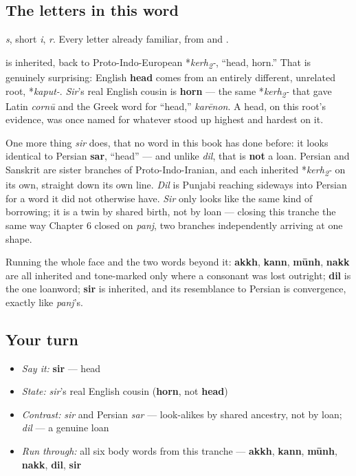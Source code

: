 \subsection*{The letters in this word}
\textbf{} \emph{s}, \textbf{} short \emph{i}, \textbf{} \emph{r}. Every letter already familiar, from \textbf{} and \textbf{}.

\begin{cousinweb}
\textbf{} is inherited, back to Proto-Indo-European *\emph{kerh\textsubscript{2}-}, \textquotedblleft{}head, horn.\textquotedblright{} That is genuinely surprising: English \textbf{head} comes from an entirely different, unrelated root, *\emph{kaput-}. \emph{Sir}'s real English cousin is \textbf{horn} — the same *\emph{kerh\textsubscript{2}-} that gave Latin \emph{cornū} and the Greek word for \textquotedblleft{}head,\textquotedblright{} \emph{karēnon}. A head, on this root's evidence, was once named for whatever stood up highest and hardest on it.

One more thing \emph{sir} does, that no word in this book has done before: it looks identical to Persian \textbf{sar}, \textquotedblleft{}head\textquotedblright{} — and unlike \emph{dil}, that is \textbf{not} a loan. Persian and Sanskrit are sister branches of Proto-Indo-Iranian, and each inherited *\emph{kerh\textsubscript{2}-} on its own, straight down its own line. \emph{Dil} is Punjabi reaching sideways into Persian for a word it did not otherwise have. \emph{Sir} only looks like the same kind of borrowing; it is a twin by shared birth, not by loan — closing this tranche the same way Chapter 6 closed on \emph{panj}, two branches independently arriving at one shape.

Running the whole face and the two words beyond it: \textbf{akkh}, \textbf{kann}, \textbf{mūnh}, \textbf{nakk} are all inherited and tone-marked only where a consonant was lost outright; \textbf{dil} is the one loanword; \textbf{sir} is inherited, and its resemblance to Persian is convergence, exactly like \emph{panj}'s.
\end{cousinweb}

\subsection*{Your turn}
\begin{itemize}
\raggedright
  \item \emph{Say it:} \textbf{sir} — head
  \item \emph{State:} \emph{sir}'s real English cousin (\textbf{horn}, not \textbf{head})
  \item \emph{Contrast:} \emph{sir} and Persian \emph{sar} — look-alikes by shared ancestry, not by loan; \emph{dil} — a genuine loan
  \item \emph{Run through:} all six body words from this tranche — \textbf{akkh}, \textbf{kann}, \textbf{mūnh}, \textbf{nakk}, \textbf{dil}, \textbf{sir}
\end{itemize}

